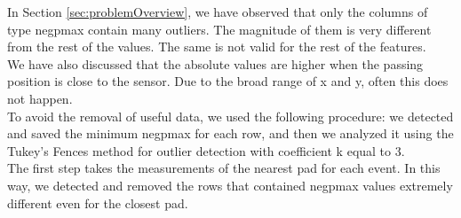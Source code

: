 \documentclass[conference]{IEEEtran}
\begin{document}
In Section \ref{sec:problemOverview}, we have observed that only the columns of type negpmax contain many outliers. The magnitude of them is very different from the rest of the values. The same is not valid for the rest of the features. \\
We have also discussed that the absolute values are higher when the passing position is close to the sensor. Due to the broad range of x and y, often this does not happen. \\ 
To avoid the removal of useful data, we used the following procedure: we detected and saved the minimum negpmax for each row, and then we analyzed it using the Tukey's Fences method for outlier detection with coefficient k equal to 3. \\
The first step takes the measurements of the nearest pad for each event. In this way, we detected and removed the rows that contained negpmax values extremely different even for the closest pad.
 
\end{document}
